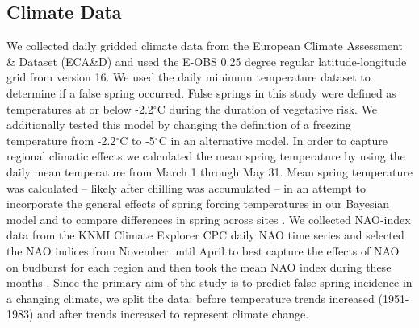 \documentclass{article}\usepackage[]{graphicx}\usepackage[]{color}
\begin{document}
\subsection*{Climate Data}
We collected daily gridded climate data from the European Climate Assessment \& Dataset (ECA\&D) and used the E-OBS 0.25 degree regular latitude-longitude grid from version 16. We used the daily minimum temperature dataset to determine if a false spring occurred. False springs in this study were defined as temperatures at or below -2.2$^{\circ}$C \citep{Schwartz1993} during the duration of vegetative risk. We additionally tested this model by changing the definition of a freezing temperature from -2.2$^{\circ}$C \citep{Schwartz1993} to -5$^{\circ}$C \citep{Lenz2013, Sakai1987} in an alternative model. In order to capture regional climatic effects we calculated the mean spring temperature by using the daily mean temperature from March 1 through May 31. Mean spring temperature was calculated -- likely after chilling was accumulated -- in an attempt to incorporate the general effects of spring forcing temperatures in our Bayesian model and to compare differences in spring across sites \citep{Basler2012, Korner2016}. We collected NAO-index data from the KNMI Climate Explorer CPC daily NAO time series and selected the NAO indices from November until April to best capture the effects of NAO on budburst for each region and then took the mean NAO index during these months \citep{NAOdata}. Since the primary aim of the study is to predict false spring incidence in a changing climate, we split the data: before temperature trends increased (1951-1983) and after trends increased \citep[1984-2016,][]{Kharouba2018, Stocker2013} to represent climate change.
\end{document}
